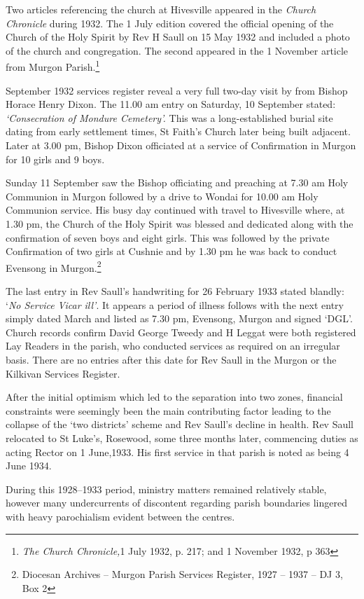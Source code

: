 Two articles referencing the church at Hivesville appeared in the \emph{Church Chronicle} during 1932. The 1 July edition covered the official opening of the Church of the Holy Spirit by Rev H Saull on 15 May 1932 and included a photo of the church and congregation. The second appeared in the 1 November article from Murgon Parish.\footnote{\emph{The Church Chronicle,}1 July 1932, p. 217; and 1 November 1932, p 363}

September 1932 services register reveal a very full two-day visit by from Bishop Horace Henry Dixon. The 11.00 am entry on Saturday, 10 September stated: \emph{`Consecration of Mondure Cemetery'.} This was a long-established burial site dating from early settlement times, St Faith's Church later being built adjacent. Later at 3.00 pm, Bishop Dixon officiated at a service of Confirmation in Murgon for 10 girls and 9 boys.

Sunday 11 September saw the Bishop officiating and preaching at 7.30 am Holy Communion in Murgon followed by a drive to Wondai for 10.00 am Holy Communion service. His busy day continued with travel to Hivesville where, at 1.30 pm, the Church of the Holy Spirit was blessed and dedicated along with the confirmation of seven boys and eight girls. This was followed by the private Confirmation of two girls at Cushnie and by 1.30 pm he was back to conduct Evensong in Murgon.\footnote{Diocesan Archives -- Murgon Parish Services Register, 1927 -- 1937 -- DJ 3, Box 2}

The last entry in Rev Saull's handwriting for 26 February 1933 stated blandly: `\emph{No Service Vicar ill'}. It appears a period of illness follows with the next entry simply dated March and listed as 7.30 pm, Evensong, Murgon and signed `DGL'. Church records confirm David George Tweedy and H Leggat were both registered Lay Readers in the parish, who conducted services as required on an irregular basis. There are no entries after this date for Rev Saull in the Murgon or the Kilkivan Services Register.

After the initial optimism which led to the separation into two zones, financial constraints were seemingly been the main contributing factor leading to the collapse of the `two districts' scheme and Rev Saull's decline in health. Rev Saull relocated to St Luke's, Rosewood, some three months later, commencing duties as acting Rector on 1 June,1933. His first service in that parish is noted as being 4 June 1934.

During this 1928--1933 period, ministry matters remained relatively stable, however many undercurrents of discontent regarding parish boundaries lingered with heavy parochialism evident between the centres.

